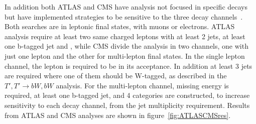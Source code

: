 In addition both ATLAS and CMS have analysis not focused in specific decays but have implemented strategies to be sensitive to the three decay channels~\cite{Aad:2015gdg,Chatrchyan:2013uxa}. Both searches are in leptonic final states, with muons or electrons. ATLAS analysis require at least two same charged leptons with at least 2 jets, at least one b-tagged jet and , while CMS divide the analysis in two channels, one with just one lepton and the other for multi-lepton final states. In the single lepton channel, the lepton is required to be in its acceptance. In addition at least 3 jets are required where one of them should be W-tagged, as described in the ${T',T'\rightarrow bW,bW}$ analysis. For the multi-lepton channel, missing energy is required, at least one b-tagged jet, and 4 categories are constructed, to increase sensitivity to each decay channel, from the jet multiplicity requirement. Results from ATLAS and CMS analyses are shown in figure~\ref{fig:ATLASCMSres}.
%


